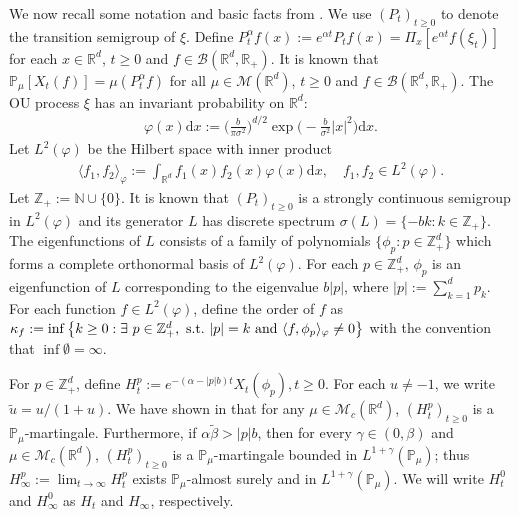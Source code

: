 \documentclass{amse-new}
\numberwithin{equation}{section}
\begin{document}
	We now recall some notation and basic facts from \cite{RenSongSunZhao2019Stable}.
	We use  $(P_t)_{t\geq 0}$ to denote the transition semigroup of $\xi$.	
	Define $P^{\alpha}_t f(x) := e^{\alpha t} P_t f(x) = \Pi_x [e^{\alpha t}f(\xi_t)]$ for each $x\in \mathbb R^d$, $t\geq 0$ and $f\in \mathcal B(\mathbb R^d, \mathbb R_+)$.
	It is known that $\mathbb{P}_{\mu}[X_t (f)]  = \mu( P^\alpha_t f)$ for all $\mu\in \mathcal M(\mathbb R^d)$, $t\geq 0$ and $f\in \mathcal B(\mathbb R^d, \mathbb R_+)$.
	The OU process $\xi$ has an invariant probability on $\mathbb R^d$:
\begin{align}
  	\varphi(x)\mathrm dx
  	:=\Big (\frac{b}{\pi \sigma^2}\Big )^{d/2}\exp \Big(-\frac{b}{\sigma^2}|x|^2 \Big)\mathrm dx.
\end{align}
	Let $L^2(\varphi)$ be the Hilbert space with inner product
\begin{align}
  	\langle f_1, f_2 \rangle_{\varphi}
  	:= \int_{\mathbb R^d}f_1(x)f_2(x)\varphi(x) \mathrm dx, \quad f_1,f_2 \in L^2(\varphi).
\end{align}
	Let $\mathbb Z_+ := \mathbb N\cup\{0\}$.
	It is known that $(P_t)_{t\geq 0}$ is a strongly continuous semigroup in $L^2(\varphi)$ and its generator $L$ has discrete spectrum $\sigma(L)= \{-bk: k \in \mathbb Z_+\}$.	
		The eigenfunctions of $L$
		consists of
		a family of polynomials $\{\phi_p:p\in \mathbb Z_+^d\}$ which forms a complete orthonormal basis of $L^2(\varphi)$.
For each $p\in \mathbb Z_+^d$,
$\phi_p$ is an eigenfunction of $L$ corresponding to the eigenvalue $b|p|$, where $|p|:= \sum_{k=1}^d p_k$.
	For each function $f\in L^2(\varphi)$, define the order of $f$ as
$\kappa_f
  	:= \inf \left \{k\geq 0: \exists ~ p\in \mathbb Z_+^d , {\rm ~s.t.~} |p|=k {\rm ~and~}  \langle f, \phi_p \rangle_{\varphi}\neq 0\right \}$
with the convention that $\inf\emptyset=\infty.$
	
	For $p\in \mathbb{Z}_+^d$, define
$H_t^p
    	:= e^{-(\alpha-|p|b)t}X_t(\phi_p), t\geq 0.$
	For each $u \neq -1$, we write $\tilde u = u/(1+ u)$.
	We have shown in \cite[Lemma 3.2]{RenSongSunZhao2019Stable} that
	for any
	$\mu\in \mathcal M_c(\mathbb R^d)$, $(H_t^p)_{t\geq 0}$ is a $\mathbb{P}_{\mu}$-martingale.
	Furthermore, if $\alpha \tilde \beta>|p|b$, then for every $\gamma\in (0, \beta)$ and $\mu\in \mathcal M_c(\mathbb R^d)$,  $(H_t^p)_{t\geq 0}$ is a $\mathbb{P}_{\mu}$-martingale bounded in $L^{1+\gamma}(\mathbb{P}_{\mu})$;
	thus $H^p_{\infty}:=\lim_{t\rightarrow \infty}H_t^p$ exists $\mathbb{P}_{\mu}$-almost surely and in $L^{1+\gamma}(\mathbb P_\mu)$.
We will write $H^0_t$ and $H^0_\infty$ as $H_t$ and $H_\infty$, respectively.
\end{document}
